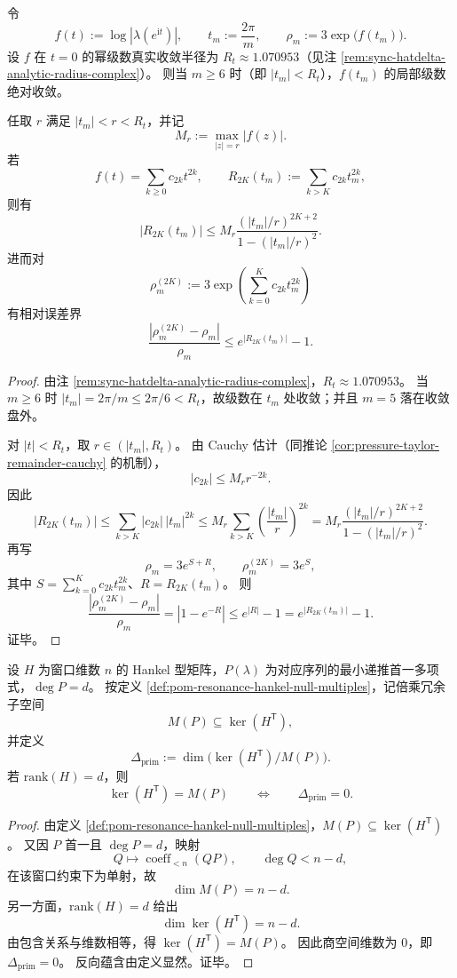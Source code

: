 \begin{theorem}\label{thm:xi-rhom-pressure-series-convergence-threshold-remainder}
令
\[
f(t):=\log|\lambda(e^{\mathrm{i}t})|,
\qquad
t_m:=\frac{2\pi}{m},
\qquad
\rho_m:=3\exp\!\bigl(f(t_m)\bigr).
\]
设 \(f\) 在 \(t=0\) 的幂级数真实收敛半径为 \(R_t\approx 1.070953\)（见注 \ref{rem:sync-hatdelta-analytic-radius-complex}）。
则当 \(m\ge 6\) 时（即 \(|t_m|<R_t\)），\(f(t_m)\) 的局部级数绝对收敛。
\par
任取 \(r\) 满足 \(|t_m|<r<R_t\)，并记
\[
M_r:=\max_{|z|=r}|f(z)|.
\]
若
\[
f(t)=\sum_{k\ge 0}c_{2k}t^{2k},
\qquad
R_{2K}(t_m):=\sum_{k>K}c_{2k}t_m^{2k},
\]
则有
\[
|R_{2K}(t_m)|
\le
M_r\frac{(|t_m|/r)^{2K+2}}{1-(|t_m|/r)^2}.
\]
进而对
\[
\rho_m^{(2K)}:=3\exp\!\left(\sum_{k=0}^{K}c_{2k}t_m^{2k}\right)
\]
有相对误差界
\[
\frac{|\rho_m^{(2K)}-\rho_m|}{\rho_m}
\le e^{|R_{2K}(t_m)|}-1.
\]
\end{theorem}
\begin{proof}
由注 \ref{rem:sync-hatdelta-analytic-radius-complex}，\(R_t\approx 1.070953\)。
当 \(m\ge 6\) 时 \(|t_m|=2\pi/m\le 2\pi/6<R_t\)，故级数在 \(t_m\) 处收敛；并且 \(m=5\) 落在收敛盘外。
\par
对 \(|t|<R_t\)，取 \(r\in(|t_m|,R_t)\)。
由 Cauchy 估计（同推论 \ref{cor:pressure-taylor-remainder-cauchy} 的机制），
\[
|c_{2k}|\le M_r r^{-2k}.
\]
因此
\[
|R_{2K}(t_m)|
\le \sum_{k>K}|c_{2k}|\,|t_m|^{2k}
\le M_r\sum_{k>K}\left(\frac{|t_m|}{r}\right)^{2k}
=M_r\frac{(|t_m|/r)^{2K+2}}{1-(|t_m|/r)^2}.
\]
再写
\[
\rho_m=3e^{S+R},\qquad
\rho_m^{(2K)}=3e^S,
\]
其中 \(S=\sum_{k=0}^{K}c_{2k}t_m^{2k}\)、\(R=R_{2K}(t_m)\)。
则
\[
\frac{|\rho_m^{(2K)}-\rho_m|}{\rho_m}
=|1-e^{-R}|
\le e^{|R|}-1
=e^{|R_{2K}(t_m)|}-1.
\]
证毕。
\end{proof}

\begin{theorem}\label{thm:xi-hankel-primitive-gap-vanishing-criterion}
设 \(H\) 为窗口维数 \(n\) 的 Hankel 型矩阵，\(P(\lambda)\) 为对应序列的最小递推首一多项式，\(\deg P=d\)。
按定义 \ref{def:pom-resonance-hankel-null-multiples}，记倍乘冗余子空间
\[
M(P)\subseteq \ker(H^{\mathsf T}),
\]
并定义
\[
\Delta_{\mathrm{prim}}
:=\dim\!\bigl(\ker(H^{\mathsf T})/M(P)\bigr).
\]
若 \(\mathrm{rank}(H)=d\)，则
\[
\ker(H^{\mathsf T})=M(P)
\qquad\Longleftrightarrow\qquad
\Delta_{\mathrm{prim}}=0.
\]
\end{theorem}
\begin{proof}
由定义 \ref{def:pom-resonance-hankel-null-multiples}，\(M(P)\subseteq\ker(H^{\mathsf T})\)。
又因 \(P\) 首一且 \(\deg P=d\)，映射
\[
Q\longmapsto \operatorname{coeff}_{<n}(QP),\qquad \deg Q<n-d,
\]
在该窗口约束下为单射，故
\[
\dim M(P)=n-d.
\]
另一方面，\(\mathrm{rank}(H)=d\) 给出
\[
\dim\ker(H^{\mathsf T})=n-d.
\]
由包含关系与维数相等，得 \(\ker(H^{\mathsf T})=M(P)\)。
因此商空间维数为 \(0\)，即 \(\Delta_{\mathrm{prim}}=0\)。
反向蕴含由定义显然。证毕。
\end{proof}


